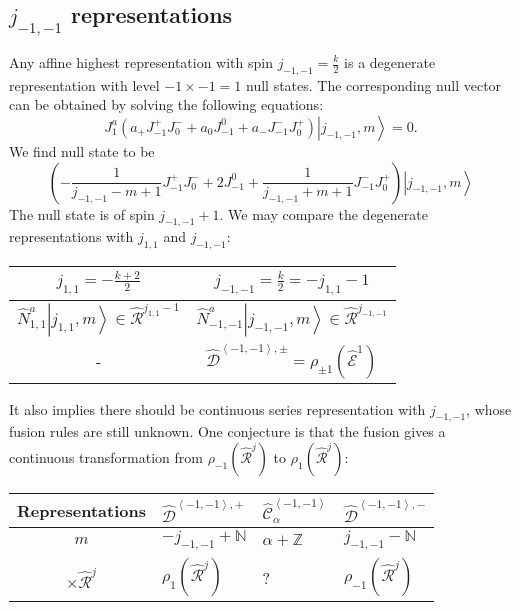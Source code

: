 \documentclass[10pt,a4paper]{article}
\numberwithin{equation}{section}
\newcommand{\ket}[1]{\left| #1 \right\rangle}
\newcommand{\vev}[1]{\left\langle #1 \right\rangle}
\begin{document}
\subsection{\texorpdfstring{$j_{-1,-1}$}{Lg} representations}
Any affine highest representation with spin $j_{-1,-1} = \frac{k}{2}$ is a degenerate representation with level $-1 \times -1 = 1$ null states. The 
corresponding null vector can be obtained by solving the following equations:
\begin{equation}
    J^{a}_{1} \left( a_{+} J^{+}_{-1} J^{-}_{0} + a_{0} J^{0}_{-1} + a_{-} J^{-}_{-1} J^{+}_{0} \right) \ket{j_{-1,-1},m} = 0.
\end{equation}
We find null state to be 
\begin{equation}
    \left(-\frac{1}{j_{-1,-1} -m + 1} J^{+}_{-1} J^{-}_{0} + 2 J^{0}_{-1} + \frac{1}{j_{-1,-1} + m +1} J^{-}_{-1} J^{+}_{0} \right) \ket{j_{-1,-1},m}
\end{equation}
The null state is of spin $j_{-1,-1} + 1$. We may compare the degenerate representations with $j_{1,1}$ and $j_{-1,-1}$:
\begin{center}
    \begin{tabular}{|c|c|}
        \hline
        $j_{1,1} = -\frac{k+2}{2}$ & $j_{-1,-1} = \frac{k}{2} = -j_{1,1}-1$\\
        \hline
        $\hat{N}^{a}_{1,1} \ket{j_{1,1},m} \in \hat{\mathcal{R}}^{j_{1,1}-1}$ & $\hat{N}^{a}_{-1,-1} \ket{j_{-1,-1},m} \in \hat{\mathcal{R}}^{j_{-1,-1}}$\\
        \hline
        - & $\hat{\mathcal{D}}^{\vev{-1,-1},\pm} = \rho_{\pm 1}\left( \hat{\mathcal{E}}^{1} \right)$\\
        \hline
    \end{tabular}
\end{center}

It also implies there should be continuous series representation with $j_{-1,-1}$, whose fusion rules are still unknown. 
One conjecture is that the fusion gives a continuous transformation from 
$\rho_{-1}(\hat{\mathcal{R}}^{j})$ to $\rho_{1}(\hat{\mathcal{R}}^{j})$:

\begin{center}
    \begin{tabular}{|c|l|l|l|}
        \hline
        Representations&$\hat{\mathcal{D}}^{\vev{-1,-1},+}$&$\hat{\mathcal{C}}^{\vev{-1,-1}}_{\alpha}$&$\hat{\mathcal{D}}^{\vev{-1,-1},-}$\\
        \hline
        $m$ & $-j_{-1,-1} + \mathbb{N}$ & $\alpha + \mathbb{Z} $ & $j_{-1,-1} - \mathbb{N}$\\
        \hline
        $\times \hat{\mathcal{R}}^{j}$&$\rho_{1}\left( \hat{\mathcal{R}}^{j} \right)$ & ? & $\rho_{-1}\left( \hat{\mathcal{R}}^{j} \right)$\\
        \hline
    \end{tabular}
\end{center}
\end{document}
